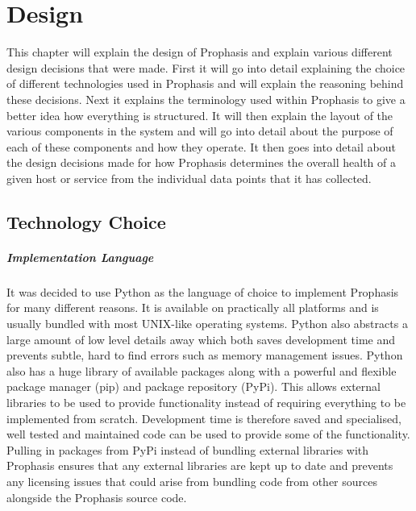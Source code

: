\documentclass[bsc,logo,twoside,parskip,singlespacing,notimes]{infthesis}
\begin{document}

\chapter{Design}
	This chapter will explain the design of Prophasis and explain various different
	design decisions that were made.  First it will go into detail explaining
	the choice of different technologies used in Prophasis and will explain the
	reasoning behind these decisions.  Next it explains the terminology used within
	Prophasis to give a better idea how everything is structured. It will then
	explain the layout of the various components in the system and will go into
	detail about the purpose of each of these components and how they operate.
	It then goes into detail about the design decisions made for how Prophasis
	determines the overall health of a given host or service from the individual
	data points that it has collected.

\section{Technology Choice}
\paragraph*{Implementation Language}
	It was decided to use Python as the language of choice to implement Prophasis
	for many different reasons. It is available on practically all
	platforms and is usually bundled with most UNIX-like operating systems.  Python
	also abstracts a large amount of low level details away which both saves
	development time and prevents subtle, hard to find errors such as memory
	management issues.  Python also has a huge library of available packages along
	with a powerful and flexible package manager (pip) and package repository
	(PyPi).  This allows external libraries to be used to provide functionality
	instead of requiring everything to be implemented from scratch.  Development time
	is therefore saved and specialised, well tested and maintained code
	can be used to provide some of the functionality.  Pulling in packages from
	PyPi instead of bundling external libraries with Prophasis ensures that any
	external libraries are kept up to date and prevents any licensing issues that
	could arise from bundling code from other sources alongside the Prophasis
	source code.
\end{document}
